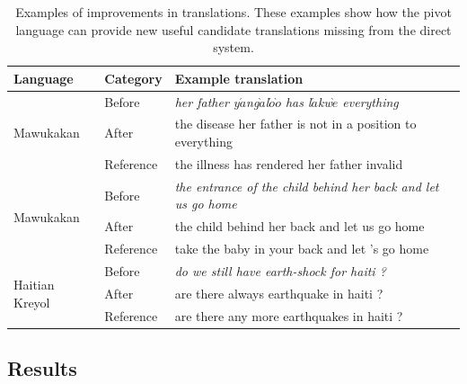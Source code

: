 \documentclass[11pt]{article}
\begin{document}
		
	\begin{table}[t]
    \centering
    {
	\begin{tabular}{|l|l|l|}
		\toprule
		Language & Category & Example translation \\
		\toprule
		\multirow{3}{*}{Mawukakan} & Before & \emph{her father y$\acute{a}$ng$\grave{a}$l$\acute{o}$$\grave{o}$ has l$\acute{a}$kw$\grave{e}$ everything} \\ & After & the disease her father is not in a position to everything \\ &  Reference & the illness has rendered her father invalid \\
		\midrule
		\multirow{3}{*}{Mawukakan} & Before & \emph{the entrance of the child behind her back and let us go home} \\ & After & the child behind her back and let us go home \\ & Reference & take the baby in your back and let 's go home \\ 
		\midrule
		\multirow{3}{*}{Haitian Kreyol} & Before & \emph{do we still have earth-shock for haiti ?} \\ & After & are there always earthquake in haiti ? \\ & Reference &  are there any more earthquakes in haiti ?\\
		\bottomrule
	\end{tabular}
    }
	\caption{Examples of improvements in translations. These examples show how the pivot language can provide new useful candidate translations missing from the direct system.}	
	\label{table:example_translations}
	\end{table}
\subsection{Results}
\label{sec:results}
	
\end{document}
